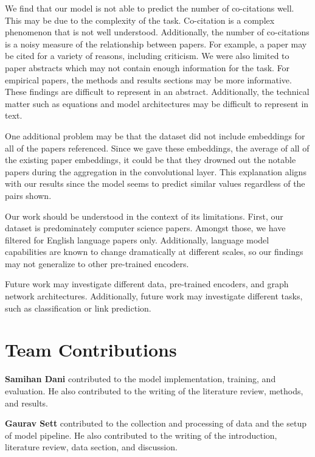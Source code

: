 \documentclass[10pt,twocolumn,letterpaper]{article}
\begin{document}
We find that our model is not able to predict the number of co-citations well. This may be due to the complexity of the task. Co-citation is a complex phenomenon that is not well understood. Additionally, the number of co-citations is a noisy measure of the relationship between papers. For example, a paper may be cited for a variety of reasons, including criticism. We were also limited to paper abstracts which may not contain enough information for the task. For empirical papers, the methods and results sections may be more informative. These findings are difficult to represent in an abstract. Additionally, the technical matter such as equations and model architectures may be difficult to represent in text.

One additional problem may be that the dataset did not include embeddings for all of the papers referenced. Since we gave these embeddings, the average of all of the existing paper embeddings, it could be that they drowned out the notable papers during the aggregation in the convolutional layer. This explanation aligns with our results since the model seems to predict similar values regardless of the pairs shown. 

Our work should be understood in the context of its limitations. First, our dataset is predominately computer science papers. Amongst those, we have filtered for English language papers only. Additionally, language model capabilities are known to change dramatically at different scales, so our findings may not generalize to other pre-trained encoders.

Future work may investigate different data, pre-trained encoders, and graph network architectures. Additionally, future work may investigate different tasks, such as classification or link prediction.

\section*{Team Contributions}

\textbf{Samihan Dani} contributed to the model implementation, training, and evaluation. He also contributed to the writing of the literature review, methods, and results.

\textbf{Gaurav Sett} contributed to the collection and processing of data and the setup of model pipeline. He also contributed to the writing of the introduction, literature review, data section, and discussion.


{\small


}
\end{document}
